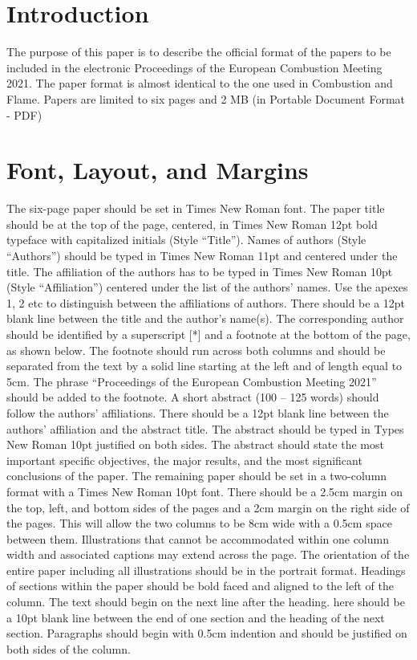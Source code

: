 \documentclass[10pt,a4paper]{ecm} %
\begin{document}
\begin{multicols}{2} %
\section*{Introduction}
The purpose of this paper is to describe the official format of the papers to be included in the electronic Proceedings of the European Combustion Meeting 2021.
The paper format is almost identical to the one used in Combustion and Flame.
Papers are limited to six pages and 2 MB (in Portable Document Format - PDF)

\section*{Font, Layout, and Margins}
The six-page paper should be set in Times New Roman font.
The paper title should be at the top of the page, centered, in Times New Roman 12pt bold typeface with capitalized initials (Style “Title”).
Names of authors (Style “Authors”) should be typed in Times New Roman 11pt and centered under the title.
The affiliation of the authors has to be typed in Times New Roman 10pt (Style “Affiliation”) centered under the list of the authors’ names.
Use the apexes 1, 2 etc to distinguish between the affiliations of authors.
There should be a 12pt blank line between the title and the author’s name(s).
The corresponding author should be identified by a superscript [*] and a footnote at the bottom of the page, as shown below. The footnote should run across both columns and should be separated from the text by a solid line starting at the left and of length equal to 5cm.
The phrase “Proceedings of the European Combustion Meeting 2021” should be added to the footnote.
A short abstract (100 – 125 words) should follow the authors’ affiliations.
There should be a 12pt blank line between the authors’ affiliation and the abstract title.
The abstract should be typed in Types New Roman 10pt justified on both sides.
The abstract should state the most important specific objectives, the major results, and the most significant conclusions of the paper.
The remaining paper should be set in a two-column format with a Times New Roman 10pt font.
There should be a 2.5cm margin on the top, left, and bottom sides of the pages and a 2cm margin on the right side of the pages.
This will allow the two columns to be 8cm wide with a 0.5cm space between them.
Illustrations that cannot be accommodated within one column width and associated captions may extend across the page.
The orientation of the entire paper including all illustrations should be in the portrait format.
Headings of sections within the paper should be bold faced and aligned to the left of the column.
The text should begin on the next line after the heading.
here should be a 10pt blank line between the end of one section and the heading of the next section.
Paragraphs should begin with 0.5cm indention and should be justified on both sides of the column.


\end{multicols}
\end{document}
